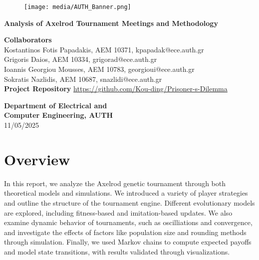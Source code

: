 \documentclass[12pt]{article}
\begin{document}
\begin{titlepage}
    \begin{center}
        \vspace{1cm}

        \begin{figure}[h]
            \centering
            \texttt{[image: media/AUTH\_Banner.png]}
        \end{figure}
        
        \vspace{2cm}
        \Huge\textbf{Analysis of Axelrod Tournament Meetings and Methodology}\\
        \vspace{2.5cm}

            
        
        \Large\textbf{Collaborators}\\  
        \vspace{0.2cm}
        \large
        Kostantinos Fotis Papadakis, AEM 10371, kpapadak@ece.auth.gr\\ 
        \vspace{0.2cm}
        Grigoris Daios, AEM 10334, grigorad@ece.auth.gr \\  
        \vspace{0.2cm}
        Ioannis Georgiou Mousses, AEM 10783, georgioui@ece.auth.gr  \\  
        \vspace{0.2cm}
        Sokratis Nazlidis, AEM 10687, snazlidi@ece.auth.gr \\  
        \vspace{2cm}
        \Large\textbf{Project Repository}
        \vspace{0.2cm}
        \large\url{https://github.com/Kou-ding/Prisoner-s-Dilemma}
        
        \begin{center}
            \large{\textbf{Department of Electrical and \\ Computer Engineering, AUTH}}\\ 11/05/2025
                
        \end{center}
    \end{center}
\end{titlepage}

\tableofcontents

\newpage

\section{Overview}
In this report, we analyze the Axelrod genetic tournament through both theoretical models and simulations. We introduced a variety of player strategies and outline the structure of the tournament engine. Different evolutionary models are explored, including fitness-based and imitation-based updates. We also examine dynamic behavior of tournaments, such as oscilliations and convergence, and investigate the effects of factors like population size and rounding methods through simulation. Finally, we used Markov chains to compute expected payoffs and model state transitions, with results validated through visualizations.
\end{document}

